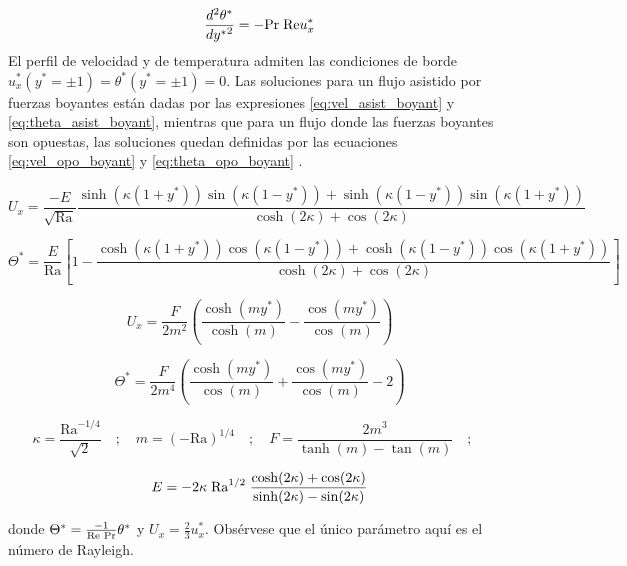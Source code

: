 \begin{equation}
\frac{d^2 \theta^*}{ d {y^*}^2 } = - {\text{Pr}} \hspace{1mm} \text{Re} u^*_x
\end{equation}
El perfil de velocidad y de temperatura admiten las condiciones de borde $u^*_x({y^*}= \pm 1) = \theta^* ({y^*}= \pm 1) = 0 $. Las soluciones para un flujo asistido por fuerzas boyantes están dadas por las expresiones \ref{eq:vel_asist_boyant} y \ref{eq:theta_asist_boyant}, mientras que para un flujo donde las fuerzas boyantes son opuestas, las soluciones quedan definidas por las ecuaciones \ref{eq:vel_opo_boyant} y \ref{eq:theta_opo_boyant} \cite{chen1996linear}. 
\small{
\begin{equation}
U_x = \frac{-E}{\sqrt{\text{Ra}}} \frac{\sinh(\kappa(1+y^*))\sin(\kappa(1-y^*)) + \sinh(\kappa(1-y^*))\sin(\kappa(1+y^*)) }{\cosh(2\kappa) + \cos(2\kappa)}
\label{eq:vel_asist_boyant}
\end{equation}

\begin{equation}
\Theta^* = \frac{E}{\text{Ra}} \left[ 1 - \frac{\cosh(\kappa(1+y^*))\cos(\kappa(1-y^*)) + \cosh(\kappa(1-y^*))\cos(\kappa(1+y^*))}{\cosh(2\kappa) + \cos(2\kappa)} \right] 
\label{eq:theta_asist_boyant}
\end{equation}


\begin{equation}
U_x = \frac{F}{2 m^2} \left( \frac{\cosh(m y^*)}{\cosh(m)} - \frac{\cos(m y^*)}{\cos(m)} \right) 
\label{eq:vel_opo_boyant}
\end{equation}

\begin{equation}
\Theta^* = \frac{F}{2 m^4} \left( \frac{\cosh(m y^*)}{\cos(m)} + \frac{\cos(m y^*)}{\cos(m)} - 2 \right) 
\label{eq:theta_opo_boyant}
\end{equation}

\begin{equation*}
\kappa = \frac{\text{Ra}^{-1/4}}{\sqrt{2}} \quad ; \quad m = (-\text{Ra})^{1/4} \quad ; \quad F = \frac{2 m^3}{\tanh(m)-\tan(m)} \quad ; \quad
\end{equation*}

\begin{equation*}
E= -2 \kappa \hspace{1mm} \text{Ra}^{1/2} \hspace{1mm} \frac{\cosh(2\kappa) + \cos(2\kappa)}{\sinh(2\kappa) - \sin(2\kappa)} 
\end{equation*}
}
donde $\Theta^*= \frac{-1}{\text{Re} \hspace{1mm} \text{Pr}} \theta^*$ y $U_x = \frac{2}{3} u^*_x$. Obsérvese que el único parámetro aquí es el número de Rayleigh.
 
